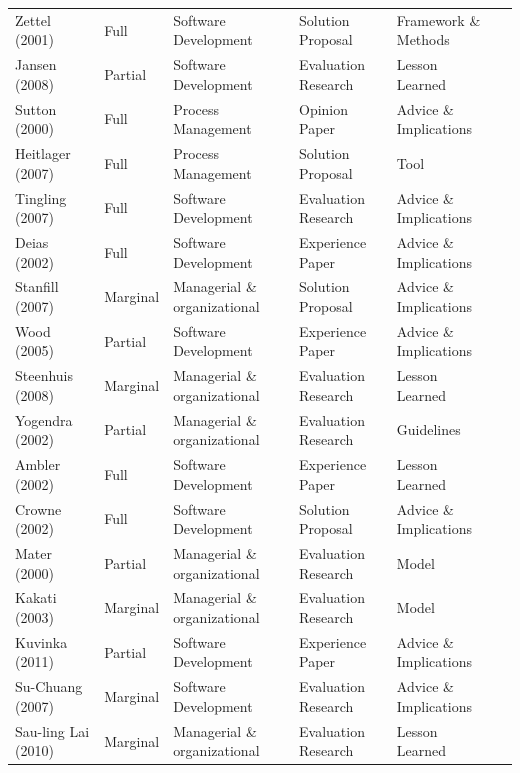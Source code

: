\documentclass[final,5p,times,twocolumn]{elsarticle}
\begin{document}
{\begin{longtable}{|p{0.5in}|p{0.5in}|p{1.3in}|p{1.1in}|p{1.1in}|p{0.2in}|}
Zettel (2001) & Full  & Software Development & Solution Proposal & Framework \& Methods & \cite{Zettel2001} \\
Jansen (2008) & Partial & Software Development & Evaluation Research & Lesson Learned & \cite{Jansen2008} \\
Sutton (2000) & Full  & Process Management & Opinion Paper & Advice \& Implications & \cite{Sutton2000} \\
Heitlager (2007) & Full  & Process Management & Solution Proposal & Tool  & \cite{Heitlager2007} \\
Tingling (2007) & Full  & Software Development & Evaluation Research & Advice \& Implications & \cite{Tingling2007} \\
Deias  (2002) & Full  & Software Development & Experience Paper & Advice \& Implications & \cite{Deias} \\
Stanfill (2007) & Marginal & Managerial \& organizational & Solution Proposal & Advice \& Implications & \cite{Stanfill2007} \\
Wood (2005) & Partial & Software Development & Experience Paper & Advice \& Implications & \cite{Wood2005} \\
Steenhuis (2008) & Marginal & Managerial \& organizational & Evaluation Research & Lesson Learned & \cite{Steenhuis2008} \\
Yogendra (2002) & Partial & Managerial \& organizational & Evaluation Research & Guidelines & \cite{Yogendra2002} \\
Ambler (2002) & Full  & Software Development & Experience Paper & Lesson Learned & \cite{Ambler2002} \\
Crowne (2002) & Full  & Software Development & Solution Proposal & Advice \& Implications & \cite{Crowne2002} \\
Mater (2000) & Partial & Managerial \& organizational & Evaluation Research & Model & \cite{Mater2000} \\
Kakati (2003) & Marginal & Managerial \& organizational & Evaluation Research & Model & \cite{Kakati2003} \\
Kuvinka (2011) & Partial & Software Development & Experience Paper & Advice \& Implications & \cite{Kuvinka2011} \\
Su-Chuang (2007) & Marginal & Software Development & Evaluation Research & Advice \& Implications & \cite{Su-Chan2007} \\
Sau-ling Lai (2010) & Marginal & Managerial \& organizational & Evaluation Research & Lesson Learned & \cite{Lai2010} \\

\end{longtable}}
\end{document}
